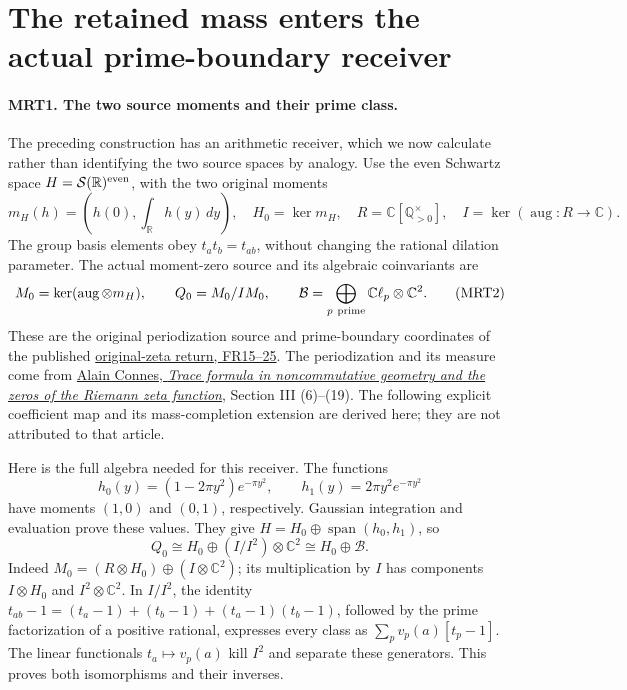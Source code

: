 \section{The retained mass enters the actual prime-boundary receiver}
\label{sec:mass-theta-prime}

\paragraph{MRT1. The two source moments and their prime class.}
The preceding construction has an arithmetic receiver, which we
now calculate rather than identifying the two source spaces by
analogy. Use the even Schwartz space \(H=\mathcal S(\mathbb R)^{\rm even}\),
with the two original moments
\[
 m_H(h)=\left(h(0),\int_{\mathbb R}h(y)\,dy\right),\quad
 H_0=\ker m_H,\quad R=\mathbb C[\mathbb Q_{>0}^{\times}],\quad
 I=\ker(\operatorname{aug}:R\to\mathbb C).                 \tag{MRT1}
\]
The group basis elements obey \(t_at_b=t_{ab}\), without changing
the rational dilation parameter. The actual moment-zero source
and its algebraic coinvariants are
\[
 M_0=\ker(\operatorname{aug}\otimes m_H),\qquad
 Q_0=M_0/IM_0,\qquad
 \mathcal B=\bigoplus_{p\ {\rm prime}}\mathbb C\ell_p\otimes\mathbb C^2.
                                                               \tag{MRT2}
\]
These are the original periodization source and prime-boundary
coordinates of the published
\href{https://github.com/KokunoYumeto/zeta-function-research-reader/blob/ec73ac350d0cda3d95c0bd1361bede33166b4d34/workbenches/splitzero-tandem/continuations/20260923-original-zeta-return/NOTE.tex}{original-zeta return, FR15--25}.
The periodization and its measure come from
\href{https://arxiv.org/abs/math/9811068v1}{Alain Connes,
\emph{Trace formula in noncommutative geometry and the zeros of the
Riemann zeta function}}, Section III (6)--(19). The following
explicit coefficient map and its mass-completion extension are
derived here; they are not attributed to that article.

Here is the full algebra needed for this receiver. The functions
\[
 h_0(y)=(1-2\pi y^2)e^{-\pi y^2},\qquad
 h_1(y)=2\pi y^2e^{-\pi y^2}
\]
have moments \((1,0)\) and \((0,1)\), respectively. Gaussian
integration and evaluation prove these values. They give
\(H=H_0\oplus\operatorname{span}(h_0,h_1)\), so
\[
 Q_0\cong H_0\oplus(I/I^2)\otimes\mathbb C^2
       \cong H_0\oplus\mathcal B.                         \tag{MRT3}
\]
Indeed \(M_0=(R\otimes H_0)\oplus(I\otimes\mathbb C^2)\);
its multiplication by \(I\) has components
\(I\otimes H_0\) and \(I^2\otimes\mathbb C^2\).
In \(I/I^2\), the identity
\(t_{ab}-1=(t_a-1)+(t_b-1)+(t_a-1)(t_b-1)\), followed by
the prime factorization of a positive rational, expresses every
class as \(\sum_p v_p(a)[t_p-1]\). The linear functionals
\(t_a\mapsto v_p(a)\) kill \(I^2\) and separate these
generators. This proves both isomorphisms and their inverses.

